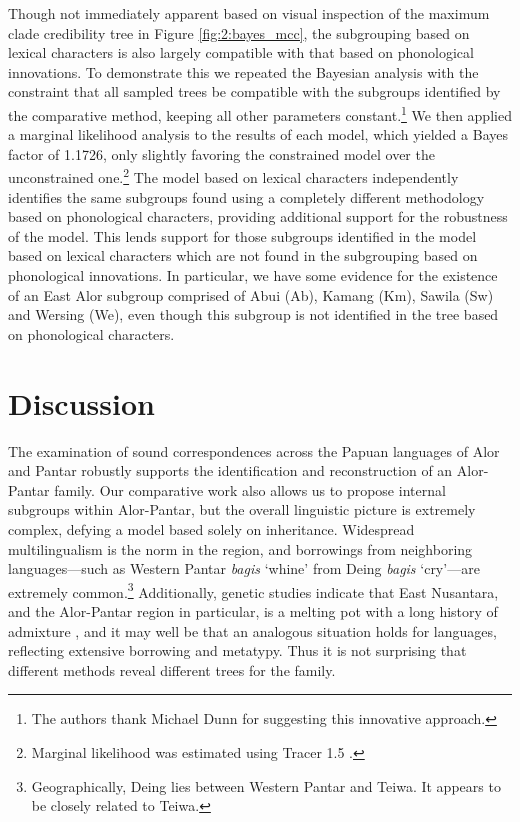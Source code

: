 Though not immediately apparent based on visual inspection of the maximum clade credibility tree in Figure \ref{fig:2:bayes_mcc}, the subgrouping based on lexical characters is also largely compatible with that based on phonological innovations. To demonstrate this we repeated the Bayesian analysis with the constraint that all sampled trees be compatible with the subgroups identified by the comparative method, keeping all other parameters constant.\footnote{ The authors thank Michael Dunn for suggesting this innovative approach. } We then applied a marginal likelihood analysis to the results of each model, which yielded a Bayes factor of 1.1726, only slightly favoring the constrained model over the unconstrained one.\footnote{ Marginal likelihood was estimated using Tracer 1.5 \citep{RambautEtAl2007}.} The model based on lexical characters independently identifies the same subgroups found using a completely different methodology 
based on phonological characters, providing additional support for the robustness of the model. This lends support for those subgroups identified in the model based on lexical characters which are not found in the subgrouping based on phonological innovations. In particular, we have some evidence for the existence of an East Alor subgroup comprised of Abui (Ab), Kamang (Km), Sawila (Sw) and Wersing (We), even though this subgroup is not identified in the tree based on phonological characters. 

\section{Discussion}\label{sect_discussion}
The examination of sound correspondences across the Papuan languages of Alor and Pantar robustly supports the identification and reconstruction of an Alor-Pantar family. Our comparative work also allows us to propose internal subgroups within Alor-Pantar, but the overall linguistic picture is extremely complex, defying a model based solely on inheritance. Widespread multilingualism is the norm in the region, and borrowings from neighboring languages---such as Western Pantar \textit{bagis }`whine' from Deing \textit{bagis} `cry'---are extremely common.\footnote{ Geographically, Deing lies between Western Pantar and Teiwa. It appears to be closely related to Teiwa. } Additionally, genetic studies indicate that East Nusantara, and the Alor-Pantar region in particular, is a melting pot with a long history of admixture \citep{MonaEtAl2009}, and it may well be that an analogous situation holds for languages, reflecting extensive borrowing and metatypy. Thus it is not surprising that 
different methods reveal different trees for the family. 

